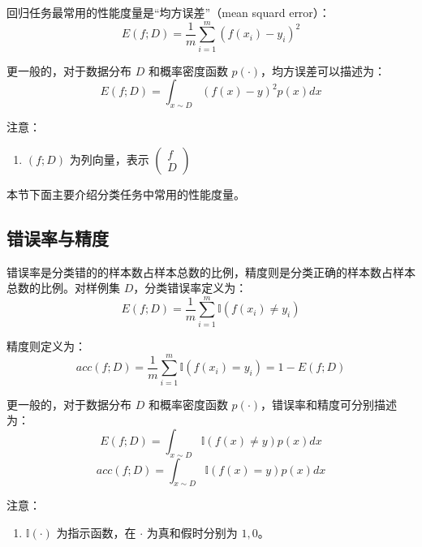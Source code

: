 \documentclass[12pt, a4paper]{article} %
\begin{document}
回归任务最常用的性能度量是“均方误差”（mean squard error）：
\begin{equation*}
    E(f; D) = \frac{1}{m} \sum_{i = 1}^{m} (f(x_i) - y_i)^2
\end{equation*}

更一般的，对于数据分布 $D$ 和概率密度函数 $p(\cdot)$，均方误差可以描述为：
\begin{equation*}
    E(f; D) = \int_{x \sim D} (f(x) - y)^2 p(x) dx
\end{equation*}

注意：
\begin{enumerate}[\hspace*{2em} i.]
    \item $(f; D)$ 为列向量，表示 $\displaystyle \left( {\begin{array}{*{20}{c}}
                      f \\
                      D
                  \end{array}} \right)$
\end{enumerate}

本节下面主要介绍分类任务中常用的性能度量。

\subsection{错误率与精度}

错误率是分类错的的样本数占样本总数的比例，精度则是分类正确的样本数占样本总数的比例。对样例集 $D$，分类错误率定义为：
\begin{equation*}
    E(f; D) = \frac{1}{m} \sum_{i = 1}^{m} \mathbb{I} (f(x_i) \ne y_i)
\end{equation*}

精度则定义为：
\begin{equation*}
    acc(f; D) = \frac{1}{m} \sum_{i = 1}^{m} \mathbb{I} (f(x_i) = y_i) = 1 - E(f; D)
\end{equation*}

更一般的，对于数据分布 $D$ 和概率密度函数 $p(\cdot)$，错误率和精度可分别描述为：
\begin{equation*}
    E(f; D) = \int_{x \sim D} \mathbb{I} (f(x) \ne y) p(x) dx
\end{equation*}
\begin{equation*}
    acc(f; D) = \int_{x \sim D} \mathbb{I} (f(x) = y) p(x) dx
\end{equation*}

注意：
\begin{enumerate}[\hspace*{2em} i.]
    \item $\mathbb{I} (\cdot)$ 为指示函数，在 $\cdot$ 为真和假时分别为 $1, 0$。
\end{enumerate}
\end{document}
